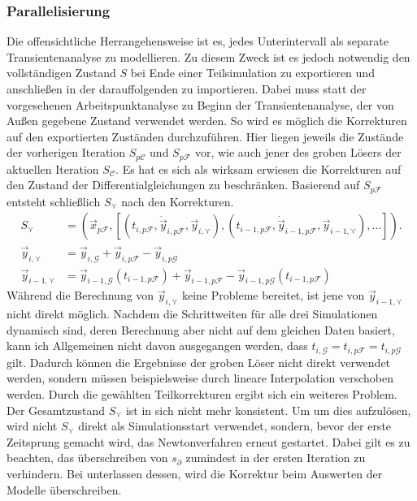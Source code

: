 \subsubsection*{Parallelisierung}
Die offensichtliche Herrangehensweise ist es, jedes Unterintervall als separate Transientenanalyse zu modellieren. Zu diesem Zweck ist es jedoch notwendig den vollständigen Zustand \(S\) bei Ende einer Teilsimulation zu exportieren und anschließen in der darauffolgenden zu importieren. Dabei muss statt der vorgesehenen Arbeitspunktanalyse zu Beginn der Transientenanalyse, der von Außen gegebene Zustand verwendet werden. So wird es möglich die Korrekturen auf den exportierten Zuständen durchzuführen. Hier liegen jeweils die Zustände der vorherigen Iteration \(S_{p\mathcal{C}}\) und \(S_{p\mathcal{F}}\) vor, wie auch jener des groben Lösers der aktuellen Iteration \(S_{\mathcal{C}}\). Es hat es sich als wirksam erwiesen die Korrekturen auf den Zustand der Differentialgleichungen zu beschränken. Basierend auf \(S_{p\mathcal{F}}\) entsteht schließlich \(S_{\curlyvee}\) nach den Korrekturen.
\begin{align*}
    S_{\curlyvee} &= (\vec{x}_{p\mathcal{F}}, [(t_{i,p\mathcal{F}},\dot{\vec{y}}_{i,p\mathcal{F}},\vec{y}_{i,\curlyvee}),(t_{i-1,p\mathcal{F}},\dot{\vec{y}}_{i-1,p\mathcal{F}},\vec{y}_{i-1,\curlyvee}),\dots]).\\
    \vec{y}_{i,\curlyvee} &= \vec{y}_{i,\mathcal{G}} + \vec{y}_{i,p\mathcal{F}} - \vec{y}_{i,p\mathcal{G}}\\
    \vec{y}_{i-1,\curlyvee} &= \vec{y}_{i-1,\mathcal{G}}(t_{i-1,p\mathcal{F}}) + \vec{y}_{i-1,p\mathcal{F}} - \vec{y}_{i-1,p\mathcal{G}}(t_{i-1,p\mathcal{F}})
\end{align*}
Während die Berechnung von \(\vec{y}_{i,\curlyvee}\) keine Probleme bereitet, ist jene von \(\vec{y}_{i-1,\curlyvee}\) nicht direkt möglich. Nachdem die Schrittweiten für alle drei Simulationen dynamisch sind, deren Berechnung aber nicht auf dem gleichen Daten basiert, kann ich Allgemeinen nicht davon ausgegangen werden, dass \(t_{i,\mathcal{G}} = t_{i,p\mathcal{F}} = t_{i,p\mathcal{G}}\) gilt. Dadurch können die Ergebnisse der groben Löser nicht direkt verwendet werden, sondern müssen beispielsweise durch lineare Interpolation verschoben werden. Durch die gewählten Teilkorrekturen ergibt sich ein weiteres Problem. Der Gesamtzustand \(S_{\curlyvee}\) ist in sich nicht mehr konsistent. Um um dies aufzulösen, wird nicht \(S_{\curlyvee}\) direkt als Simulationsstart verwendet, sondern, bevor der erste Zeitsprung gemacht wird, das Newtonverfahren erneut gestartet. Dabei gilt es zu beachten, das überschreiben von \(s_\partial\) zumindest in der ersten Iteration zu verhindern. Bei unterlassen dessen, wird die Korrektur beim Auswerten der Modelle überschreiben.